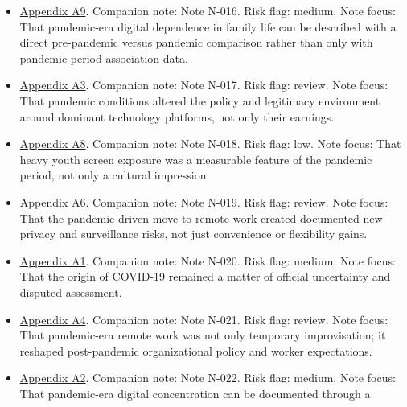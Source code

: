 \documentclass[
  american,
  11pt,
  letterpaper,
]{article}
\providecommand{\tightlist}{%
  \setlength{\itemsep}{0pt}\setlength{\parskip}{0pt}}
\begin{document}
\begin{itemize}
\tightlist
\item
  \hyperref[ch-03-appendix-a9-kids-screen-time-up-50-during-pandemic]{Appendix
  A9}. Companion note: Note N-016. Risk flag: medium. Note focus: That
  pandemic-era digital dependence in family life can be described with a
  direct pre-pandemic versus pandemic comparison rather than only with
  pandemic-period association data.
\item
  \hyperref[ch-03-appendix-a3-pandemic-provides-a-techlash-reprieve]{Appendix
  A3}. Companion note: Note N-017. Risk flag: review. Note focus: That
  pandemic conditions altered the policy and legitimacy environment
  around dominant technology platforms, not only their earnings.
\item
  \hyperref[ch-03-appendix-a8-excessive-screen-time-is-associated-with-mental-health-problems-and-adhd-in-us-children-and-adolescents-physical-activity-and-sleep-as-parallel-mediators]{Appendix
  A8}. Companion note: Note N-018. Risk flag: low. Note focus: That
  heavy youth screen exposure was a measurable feature of the pandemic
  period, not only a cultural impression.
\item
  \hyperref[ch-03-appendix-a6-remote-working-pre-and-post-covid-19-an-analysis-of-new-threats-and-risks-to-security-and-privacy]{Appendix
  A6}. Companion note: Note N-019. Risk flag: review. Note focus: That
  the pandemic-driven move to remote work created documented new privacy
  and surveillance risks, not just convenience or flexibility gains.
\item
  \hyperref[ch-03-appendix-a1-report-on-potential-links-between-the-wuhan-institute-of-virology-and-the-origins-of-covid-19]{Appendix
  A1}. Companion note: Note N-020. Risk flag: medium. Note focus: That
  the origin of COVID-19 remained a matter of official uncertainty and
  disputed assessment.
\item
  \hyperref[ch-03-appendix-a4-work-from-home-is-here-to-stay-call-for-flexibility-in-post-pandemic-work-policies]{Appendix
  A4}. Companion note: Note N-021. Risk flag: review. Note focus: That
  pandemic-era remote work was not only temporary improvisation; it
  reshaped post-pandemic organizational policy and worker expectations.
\item
  \hyperref[ch-03-appendix-a2-big-tech-announces-striking-pandemic-gains-as-small-businesses-strain-to-find-their-footing]{Appendix
  A2}. Companion note: Note N-022. Risk flag: medium. Note focus: That
  pandemic-era digital concentration can be documented through a

\end{itemize}
\end{document}

